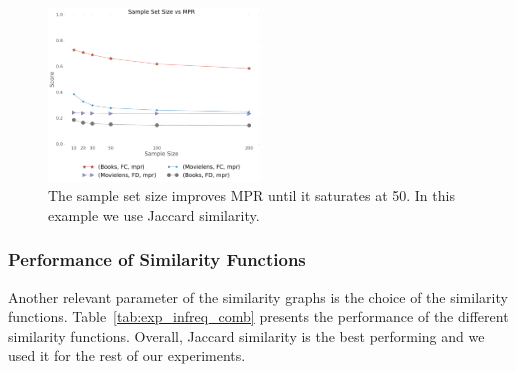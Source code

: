 \begin{figure}[t]
\includegraphics[width=0.5\textwidth]{reference_size_vs_MPR.pdf}
\caption[]{The sample set size improves MPR until it saturates at 50. In this example we use Jaccard similarity.}
\label{fig:samples_mpr}
\end{figure}

\subsubsection{Performance of Similarity Functions} 
Another relevant parameter of the similarity graphs is the choice of the similarity functions. Table~\ref{tab:exp_infreq_comb} presents the performance of the different similarity functions. Overall, Jaccard similarity is the best performing and we used it for the rest of our experiments.

